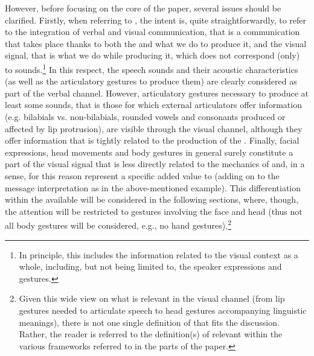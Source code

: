 \documentclass[output=paper]{langsci/langscibook}
\begin{document}
However, before focusing on the core of the paper, several issues should be clarified. Firstly, when referring to , the intent is, quite straightforwardly, to refer to the integration of verbal and visual communication, that is a communication that takes place thanks to both the  and what we do to produce it, and the visual signal, that is what we do while producing it, which does not correspond (only) to sounds.\footnote{\label{fn:gil:2}In principle, this includes the information related to the visual context as a whole, including, but not being limited to, the speaker expressions and gestures.} In this respect, the speech sounds and their acoustic characteristics (as well as the articulatory gestures to produce them) are clearly considered as part of the verbal channel. However, articulatory gestures necessary to produce at least some sounds, that is those for which external articulators offer information (e.g. bilabials vs. non-bilabials, rounded vowels and consonants produced or affected by lip protrusion), are visible through the visual channel, although they offer information that is tightly related to the production of the . Finally, facial expressions, head movements and body gestures in general surely constitute a part of the visual signal that is less directly related to the mechanics of  and, in a sense, for this reason represent a specific added value to  (adding on to the message interpretation as in the above-mentioned example). This differentiation within the  available will be considered in the following sections, where, though, the attention will be restricted to gestures involving the face and head (thus not all body gestures will be considered, e.g., no hand gestures).\footnote{Given this wide view on what is relevant in the visual channel (from lip gestures needed to articulate speech to head gestures accompanying linguistic meanings), there is not one single definition of  that fits the discussion. Rather, the reader is referred to the definition(s) of  relevant within the various frameworks referred to in the parts of the paper.} 
\end{document}
